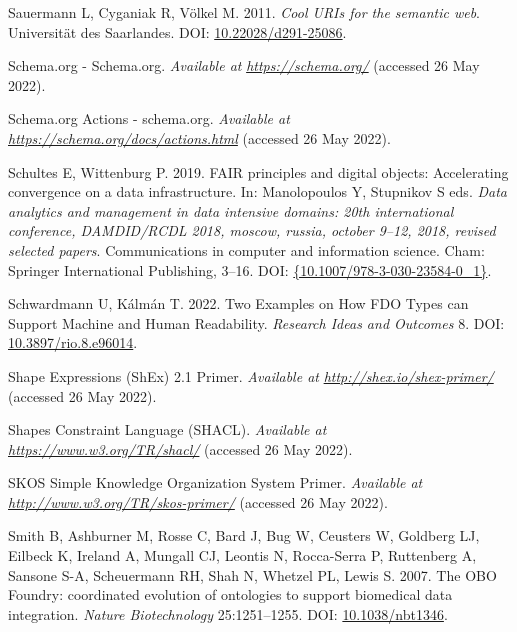 \begin{CSLReferences}{1}{0}
\leavevmode{}%
Sauermann L, Cyganiak R, Völkel M. 2011. \emph{Cool URIs for the semantic web}. Universität des Saarlandes. DOI: \href{https://doi.org/10.22028/d291-25086}{10.22028/d291-25086}.

\leavevmode{}%
Schema.org - Schema.org. \emph{Available at} \href{https://schema.org/}{\emph{https://schema.org/}} (accessed 26 May 2022).

\leavevmode{}%
Schema.org Actions - schema.org. \emph{Available at} \href{https://schema.org/docs/actions.html}{\emph{https://schema.org/docs/actions.html}} (accessed 26 May 2022).

\leavevmode{}%
Schultes E, Wittenburg P. 2019. FAIR principles and digital objects: Accelerating convergence on a data infrastructure. In: Manolopoulos Y, Stupnikov S eds. \emph{Data analytics and management in data intensive domains: 20th international conference, DAMDID/RCDL 2018, moscow, russia, october 9--12, 2018, revised selected papers}. Communications in computer and information science. Cham: Springer International Publishing, 3--16. DOI: \href{https://doi.org/\%7B10.1007/978-3-030-23584-0_1\%7D}{\{10.1007/978-3-030-23584-0\_1\}}.

\leavevmode{}%
Schwardmann U, Kálmán T. 2022. Two Examples on How FDO Types can Support Machine and Human Readability. \emph{Research Ideas and Outcomes} 8. DOI: \href{https://doi.org/10.3897/rio.8.e96014}{10.3897/rio.8.e96014}.

\leavevmode{}%
Shape Expressions (ShEx) 2.1 Primer. \emph{Available at} \href{http://shex.io/shex-primer/}{\emph{http://shex.io/shex-primer/}} (accessed 26 May 2022).

\leavevmode{}%
Shapes Constraint Language (SHACL). \emph{Available at} \href{https://www.w3.org/TR/shacl/}{\emph{https://www.w3.org/TR/shacl/}} (accessed 26 May 2022).

\leavevmode{}%
SKOS Simple Knowledge Organization System Primer. \emph{Available at} \href{http://www.w3.org/TR/skos-primer/}{\emph{http://www.w3.org/TR/skos-primer/}} (accessed 26 May 2022).

\leavevmode{}%
Smith B, Ashburner M, Rosse C, Bard J, Bug W, Ceusters W, Goldberg LJ, Eilbeck K, Ireland A, Mungall CJ, Leontis N, Rocca-Serra P, Ruttenberg A, Sansone S-A, Scheuermann RH, Shah N, Whetzel PL, Lewis S. 2007. The OBO Foundry: coordinated evolution of ontologies to support biomedical data integration. \emph{Nature Biotechnology} 25:1251--1255. DOI: \href{https://doi.org/10.1038/nbt1346}{10.1038/nbt1346}.


\end{CSLReferences}
